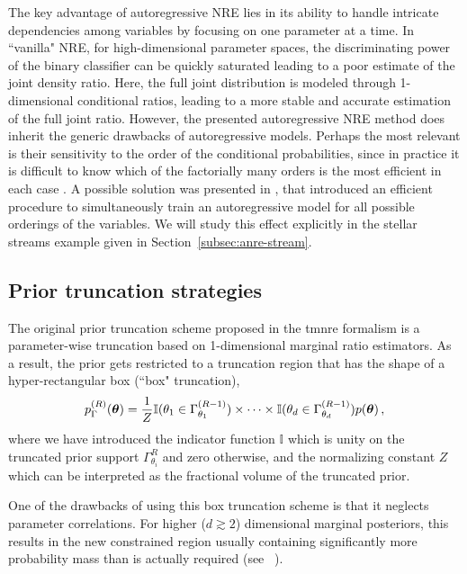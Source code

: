 The key advantage of autoregressive NRE lies in its ability to handle intricate dependencies among variables by focusing on one parameter at a time. In ``vanilla" NRE, for high-dimensional parameter spaces, the discriminating power of the binary classifier can be quickly saturated leading to a poor estimate of the joint density ratio. Here, the full joint distribution is modeled through 1-dimensional conditional ratios, leading to a more stable and accurate estimation of the full joint ratio. However, the presented autoregressive NRE method does inherit the generic drawbacks of autoregressive models. Perhaps the most relevant is their sensitivity to the order of the conditional probabilities, since in practice it is difficult to know which of the factorially many orders is the most efficient in each case \cite{Papamakarios:2017tec}. A possible solution was presented in \cite{Uria:2013aa}, that introduced an efficient procedure to simultaneously train an autoregressive model for all possible orderings of the variables. We will study this effect explicitly in the stellar streams example given in Section~\ref{subsec:anre-stream}. 


\subsection{Prior truncation strategies}\label{subsec:anre-truncation}

 The original prior truncation scheme proposed in the \gls*{tmnre} formalism \cite{Miller:2021aa} is a parameter-wise truncation based on 1-dimensional marginal ratio estimators. As a result, the prior gets restricted to a truncation region that has the shape of a hyper-rectangular box (``box" truncation), 
\begin{equation} \label{eq:anre-box}
     p^{(R)}_{\Gamma}(\bm{\theta}) = \frac1Z \mathbb{I}(\theta_1 \in \Gamma_{\theta_1}^{(R-1)}) \times \cdots \times\mathbb{I}(\theta_d \in \Gamma_{\theta_d}^{(R-1)}) p(\bm{\theta}) \,,
\end{equation}
where we have introduced the indicator function $\mathbb{I}$ which is unity on the truncated prior support $\Gamma_{\theta_i}^R$ and zero otherwise, and the normalizing constant $Z$ which can be interpreted as the fractional volume of the truncated prior.

One of the drawbacks of using this box truncation scheme is that it neglects parameter correlations. For higher ($d \gtrsim 2$) dimensional marginal posteriors, this results in the new constrained region usually containing significantly more probability mass than is actually required (see \eg~\cite{Karchev:2022xyn}).

